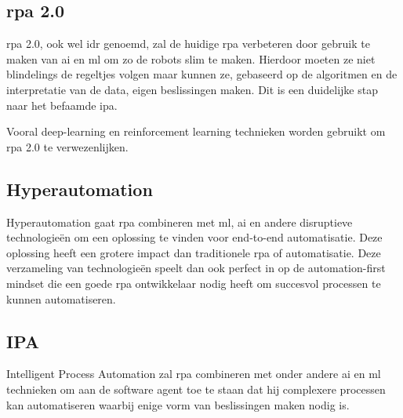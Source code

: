 \subsection{\acrshort{rpa} 2.0}
\acrshort{rpa} 2.0, ook wel \acrfull{idr} genoemd, zal de huidige \acrshort{rpa} verbeteren door gebruik te maken van \acrshort{ai} en \acrshort{ml} om zo de robots slim te maken. Hierdoor moeten ze niet blindelings de regeltjes volgen maar kunnen ze, gebaseerd op de algoritmen en de interpretatie van de data, eigen beslissingen maken. Dit is een duidelijke stap naar het befaamde  \acrshort{ipa}. \autocite{idrRPA}

Vooral deep-learning en reinforcement learning technieken worden gebruikt om \acrshort{rpa} 2.0 te verwezenlijken. \autocite{idrRPA}

\subsection{Hyperautomation}
Hyperautomation gaat \acrshort{rpa} combineren met  \acrshort{ml},  \acrshort{ai} en andere disruptieve technologieën om een oplossing te vinden voor end-to-end automatisatie. Deze oplossing heeft een grotere impact dan traditionele \acrshort{rpa} of automatisatie. Deze verzameling van technologieën speelt dan ook perfect in op de automation-first mindset die een goede \acrshort{rpa} ontwikkelaar nodig heeft om succesvol processen te kunnen automatiseren. \autocite{hyperautomation}

\subsection{IPA}
Intelligent Process Automation zal \acrshort{rpa} combineren met onder andere \acrshort{ai} en  \acrshort{ml} technieken om aan de software agent toe te staan dat hij complexere processen kan automatiseren waarbij enige vorm van beslissingen maken nodig is.

